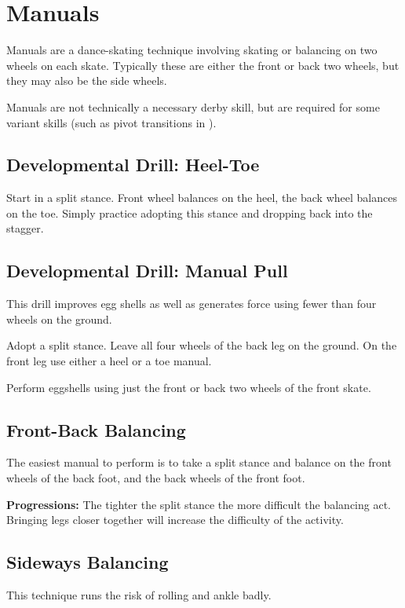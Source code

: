 \section{Manuals}
\label{sec:sticky/manuals}

Manuals are a dance-skating technique involving skating or balancing on two wheels on each skate.   
Typically these are either the front or back two wheels, but they may also be the side wheels.

Manuals are not technically a necessary derby skill, but are required for some variant skills (such as pivot transitions in ).    


\subsection*{Developmental Drill: Heel-Toe}

Start in a split stance. Front wheel balances on the heel, the back wheel balances on the toe. 
Simply practice adopting this stance and dropping back into the stagger.

\subsection*{Developmental Drill: Manual Pull}

This drill improves egg shells as well as generates force using fewer than four wheels on the ground.  

Adopt a split stance. 
Leave all four wheels of the back leg on the ground.  
On the front leg use either a heel or a toe manual.  

Perform eggshells using just the front or back two wheels of the front skate. 


\subsection*{Front-Back Balancing}

The easiest manual to perform is to take a split stance and balance on the front wheels of the back foot, and the back wheels of the front foot. 

{\bf Progressions:}
The tighter the split stance the more difficult the balancing act.
Bringing legs closer together will increase the difficulty of the activity.


\subsection*{Sideways Balancing}
This technique runs the risk of rolling and ankle badly.

